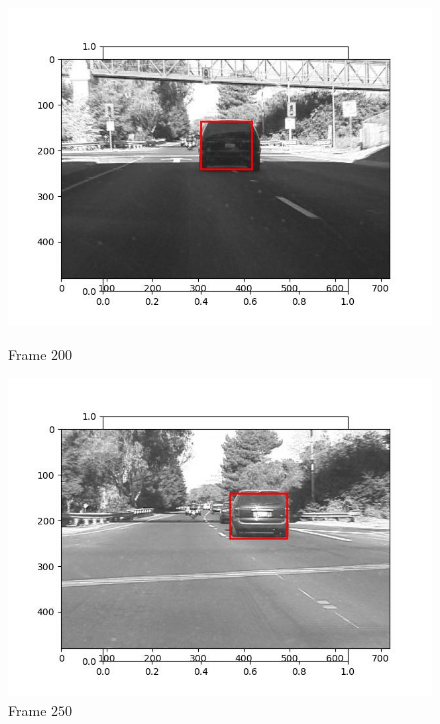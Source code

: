 \begin{figure}[H]
\begin{minipage}{.49\textwidth}
    \includegraphics[width=\textwidth]{./figures/lk_affine/car1/frame000200.jpg}
    \caption{Frame $200$}
  \end{minipage}
  \hfill
  \begin{minipage}{.49\textwidth}
    \centering
    \includegraphics[width=\textwidth]{./figures/lk_affine/car1/frame000250.jpg}
    \caption{Frame $250$}
  \end{minipage}
\end{figure}


